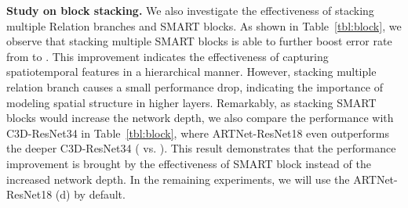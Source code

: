 \documentclass[10pt,twocolumn,letterpaper]{article}
\begin{document}
{\bf Study on block stacking.} We also investigate the effectiveness of stacking multiple Relation branches and SMART blocks. As shown in Table~\ref{tbl:block}, we observe that stacking multiple SMART blocks is able to further boost error rate from  to . This improvement indicates the effectiveness of capturing spatiotemporal features in a hierarchical manner. However, stacking multiple relation branch causes a small performance drop, indicating the importance of modeling spatial structure in higher layers. Remarkably, as stacking SMART blocks would increase the network depth, we also compare the performance with C3D-ResNet34 in Table~\ref{tbl:block}, where ARTNet-ResNet18 even outperforms the deeper C3D-ResNet34 ( vs. ). This result demonstrates that the performance improvement is brought by the effectiveness of SMART block instead of the increased network depth. In the remaining experiments, we will use the ARTNet-ResNet18 (d) by default.

\begin{table}
\centering
{}
\vspace{1mm}
\caption{Comparison of ARTNet and C3D with two stream input, i.e., RGB and Optical Flow. The results are reported on the validation set of Kinetics with the measure of {\bf Top-1 and Top-5 accuracy}.}
\label{tbl:two-stream}
\vspace{-3mm}
\end{table}
\end{document}
